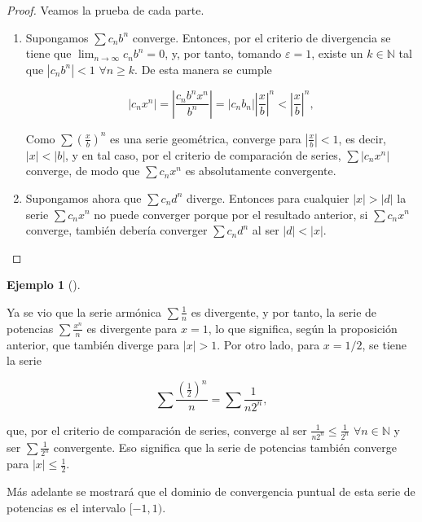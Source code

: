 \documentclass[
  a4paper,
]{scrreport}
\theoremstyle{definition}
\newtheorem{example}{Ejemplo}[chapter]
\theoremstyle{plain}
\theoremstyle{definition}
\theoremstyle{definition}
\theoremstyle{plain}
\theoremstyle{plain}
\theoremstyle{remark}
\begin{document}
\begin{tcolorbox}[enhanced jigsaw, leftrule=.75mm, colbacktitle=quarto-callout-note-color!10!white, toprule=.15mm, opacityback=0, opacitybacktitle=0.6, toptitle=1mm, breakable, bottomtitle=1mm, colframe=quarto-callout-note-color-frame, rightrule=.15mm, titlerule=0mm, title=\textcolor{quarto-callout-note-color}{\faInfo}\hspace{0.5em}{Demostración}, arc=.35mm, left=2mm, bottomrule=.15mm, colback=white, coltitle=black]

\begin{proof}
Veamos la prueba de cada parte.

\begin{enumerate}
\def\labelenumi{\alph{enumi}.}
\item
  Supongamos \(\sum c_nb^n\) converge. Entonces, por el criterio de
  divergencia se tiene que \(\lim_{n\to\infty} c_nb^n=0\), y, por tanto,
  tomando \(\varepsilon = 1\), existe un \(k\in\mathbb{N}\) tal que
  \(|c_nb^n|<1\) \(\forall n\geq k\). De esta manera se cumple

  \[
   |c_nx^n| =  \left|\frac{c_nb^nx^n}{b^n}\right| = |c_nb_n|\left|\frac{x}{b}\right|^n < \left|\frac{x}{b}\right|^n,
   \]

  Como \(\sum \left(\frac{x}{b}\right)^n\) es una serie geométrica,
  converge para \(\left|\frac{x}{b}\right|<1\), es decir, \(|x|<|b|\), y
  en tal caso, por el criterio de comparación de series,
  \(\sum |c_nx^n|\) converge, de modo que \(\sum c_nx^n\) es
  absolutamente convergente.
\item
  Supongamos ahora que \(\sum c_nd^n\) diverge. Entonces para cualquier
  \(|x|>|d|\) la serie \(\sum c_nx^n\) no puede converger porque por el
  resultado anterior, si \(\sum c_nx^n\) converge, también debería
  converger \(\sum c_nd^n\) al ser \(|d|<|x|\).
\end{enumerate}

\end{proof}

\end{tcolorbox}

\begin{example}[]\protect\hypertarget{exm-intervalo-convergencia-serie-potencias}{}\label{exm-intervalo-convergencia-serie-potencias}

Ya se vio que la serie armónica \(\sum \frac{1}{n}\) es divergente, y
por tanto, la serie de potencias \(\sum \frac{x^n}{n}\) es divergente
para \(x=1\), lo que significa, según la proposición anterior, que
también diverge para \(|x|>1\). Por otro lado, para \(x=1/2\), se tiene
la serie

\[
\sum \frac{\left(\frac{1}{2}\right)^n}{n} = \sum \frac{1}{n2^n},
\]

que, por el criterio de comparación de series, converge al ser
\(\frac{1}{n2^n}\leq\frac{1}{2^n}\) \(\forall n\in\mathbb{N}\) y ser
\(\sum \frac{1}{2^n}\) convergente. Eso significa que la serie de
potencias también converge para \(|x|\leq \frac{1}{2}\).

Más adelante se mostrará que el dominio de convergencia puntual de esta
serie de potencias es el intervalo \([-1,1)\).

\end{example}
\end{document}
